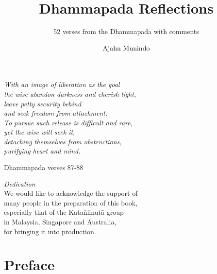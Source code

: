 \documentclass{aruno-gist}
\title{Dhammapada Reflections}
\subtitle{52 verses from the Dhammapada with comments}
\author{Ajahn Munindo}
\date{}
\begin{document}
\emptysheet


\frontmatter*
\pagestyle{empty}

\midsloppy

\cleartorecto
\begin{quotepage}{60mm}
\centering
\itshape
With an image of liberation as the goal\\
the wise abandon darkness and cherish light,\\
leave petty security behind \\
and seek freedom from attachment.\\
To pursue such release is difficult and rare, \\
yet the wise will seek it, \\
detaching themselves from obstructions,\\
purifying heart and mind.

{\smaller Dhammapada verses 87-88}
\end{quotepage}

\cleartoverso
\begin{quotepage}{80mm}
\centering
\textit{Dedication}\\[0.4\baselineskip]
We would like to acknowledge the support of\\
many people in the preparation of this book,\\
especially that of the Kataññnutā group\\
in Malaysia, Singapore and Australia,\\
for bringing it into production.

\end{quotepage}

\cleartorecto
\thispagestyle{empty}


\cleartoverso
\thispagestyle{empty}



\chapter{Preface}



\mainmatter*

\cleartorecto
\thispagestyle{empty}
{\centering

\vspace*{0.6\textheight}
{\chapNameFont\LARGE\color{chaptitle}}

}
\end{document}
